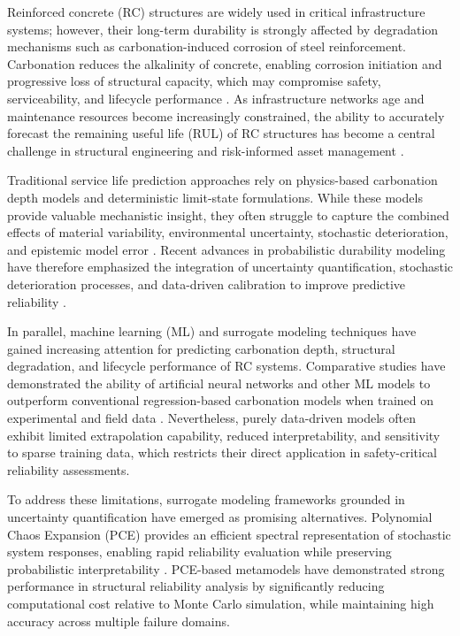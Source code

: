 Reinforced concrete (RC) structures are widely used in critical infrastructure systems; however, their long-term durability is strongly affected by degradation mechanisms such as carbonation-induced corrosion of steel reinforcement. Carbonation reduces the alkalinity of concrete, enabling corrosion initiation and progressive loss of structural capacity, which may compromise safety, serviceability, and lifecycle performance \citep{wang2024review, aslaniprobabilistic2020}. As infrastructure networks age and maintenance resources become increasingly constrained, the ability to accurately forecast the remaining useful life (RUL) of RC structures has become a central challenge in structural engineering and risk-informed asset management \citep{ellingwood2016introduction}.

Traditional service life prediction approaches rely on physics-based carbonation depth models and deterministic limit-state formulations. While these models provide valuable mechanistic insight, they often struggle to capture the combined effects of material variability, environmental uncertainty, stochastic deterioration, and epistemic model error \citep{pinto2022service}. Recent advances in probabilistic durability modeling have therefore emphasized the integration of uncertainty quantification, stochastic deterioration processes, and data-driven calibration to improve predictive reliability \citep{wang2024review}.

In parallel, machine learning (ML) and surrogate modeling techniques have gained increasing attention for predicting carbonation depth, structural degradation, and lifecycle performance of RC systems. Comparative studies have demonstrated the ability of artificial neural networks and other ML models to outperform conventional regression-based carbonation models when trained on experimental and field data \citep{couto2025machine}. Nevertheless, purely data-driven models often exhibit limited extrapolation capability, reduced interpretability, and sensitivity to sparse training data, which restricts their direct application in safety-critical reliability assessments.

To address these limitations, surrogate modeling frameworks grounded in uncertainty quantification have emerged as promising alternatives. Polynomial Chaos Expansion (PCE) provides an efficient spectral representation of stochastic system responses, enabling rapid reliability evaluation while preserving probabilistic interpretability \citep{lim2021distribution, lamouri2024reliability}. PCE-based metamodels have demonstrated strong performance in structural reliability analysis by significantly reducing computational cost relative to Monte Carlo simulation, while maintaining high accuracy across multiple failure domains.

